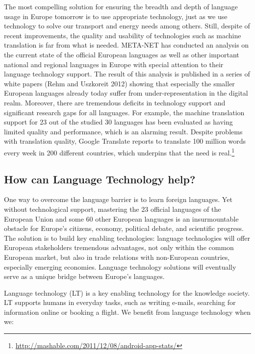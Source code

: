 \documentclass[10pt, plain]{../../metanetpaper}
\begin{document}
\begin{multicols}{2}
The most compelling solution for ensuring the breadth and depth of language usage in Europe tomorrow is to use appropriate technology, just as we use technology to solve our transport and energy needs among others. Still, despite of recent improvements, the quality and usability of technologies such as machine translation is far from what is needed. META-NET has conducted an analysis on the current state of the official European languages as well as other important national and regional languages in Europe with special attention to their language technology support. The result of this analysis is published in a series of white papers (Rehm and Uszkoreit 2012) showing that especially the smaller European languages already today suffer from under-representation in the digital realm. Moreover, there are tremendous deficits in technology support and significant research gaps for all languages. For example, the machine translation support for 23 out of the studied 30 languages has been evaluated as having limited quality and performance, which is an alarming result. Despite problems with translation quality, Google Translate reports to translate 100 million words every week in 200 different countries, which underpins that the need is real.\footnote{\url{http://mashable.com/2011/12/08/android-app-stats/}}  

\subsection{How can Language Technology help?}
\label{sec:how-can-language-technology-help}

One way to overcome the language barrier is to learn foreign languages. Yet without technological support, mastering the 23 official languages of the European Union and some 60 other European languages is an insurmountable obstacle for Europe’s citizens, economy, political debate, and scientific progress. The solution is to build key enabling technologies: language technologies will offer European stakeholders tremendous advantages, not only within the common European market, but also in trade relations with non-European countries, especially emerging economies. Language technology solutions will eventually serve as a unique bridge between Europe’s languages. 

Language technology (LT) is a key enabling technology for the knowledge society. LT supports humans in everyday tasks, such as writing e-mails, searching for information online or booking a flight. We benefit from language technology when we:


\end{multicols}
\end{document}
